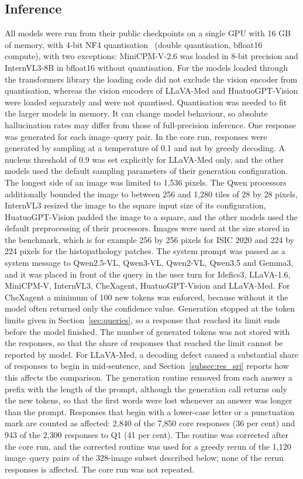 \documentclass[11pt,a4paper]{article}
\begin{document}


\subsection{Inference}\label{sec:inference}
All models were run from their public checkpoints on a single GPU with 16 GB of memory, with 4-bit NF4 quantisation~\citep{dettmers2023qlora} (double quantisation, bfloat16 compute), with two exceptions: MiniCPM-V-2.6 was loaded in 8-bit precision and InternVL3-8B in bfloat16 without quantisation. For the models loaded through the transformers library the loading code did not exclude the vision encoder from quantisation, whereas the vision encoders of LLaVA-Med and HuatuoGPT-Vision were loaded separately and were not quantised. Quantisation was needed to fit the larger models in memory. It can change model behaviour, so absolute hallucination rates may differ from those of full-precision inference. One response was generated for each image--query pair. In the core run, responses were generated by sampling at a temperature of 0.1 and not by greedy decoding. A nucleus threshold of 0.9 was set explicitly for LLaVA-Med only, and the other models used the default sampling parameters of their generation configuration. The longest side of an image was limited to 1{,}536 pixels. The Qwen processors additionally bounded the image to between 256 and 1{,}280 tiles of 28 by 28 pixels, InternVL3 resized the image to the square input size of its configuration, HuatuoGPT-Vision padded the image to a square, and the other models used the default preprocessing of their processors. Images were used at the size stored in the benchmark, which is for example 256 by 256 pixels for ISIC 2020 and 224 by 224 pixels for the histopathology patches. The system prompt was passed as a system message to Qwen2.5-VL, Qwen3-VL, Qwen2-VL, Qwen3.5 and Gemma3, and it was placed in front of the query in the user turn for Idefics3, LLaVA-1.6, MiniCPM-V, InternVL3, CheXagent, HuatuoGPT-Vision and LLaVA-Med. For CheXagent a minimum of 100 new tokens was enforced, because without it the model often returned only the confidence value. Generation stopped at the token limits given in Section~\ref{sec:queries}, so a response that reached its limit ends before the model finished. The number of generated tokens was not stored with the responses, so that the share of responses that reached the limit cannot be reported by model.
For LLaVA-Med, a decoding defect caused a substantial share of responses to begin in mid-sentence, and Section~\ref{subsec:res_sri} reports how this affects the comparison. The generation routine removed from each answer a prefix with the length of the prompt, although the generation call returns only the new tokens, so that the first words were lost whenever an answer was longer than the prompt. Responses that begin with a lower-case letter or a punctuation mark are counted as affected: 2{,}840 of the 7{,}850 core responses (36 per cent) and 943 of the 2{,}300 responses to Q1 (41 per cent). The routine was corrected after the core run, and the corrected routine was used for a greedy rerun of the 1{,}120 image--query pairs of the 328-image subset described below; none of the rerun responses is affected. The core run was not repeated.
\end{document}
